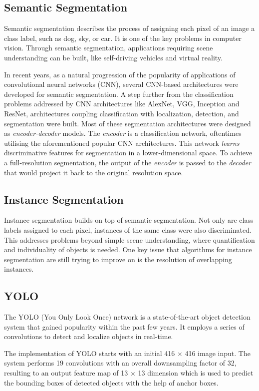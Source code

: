 \documentclass[journal]{IEEEtran}
\begin{document}
\subsection{Semantic Segmentation}
Semantic segmentation describes the process of assigning each pixel of an image a class label, such as dog, sky, or car. It is one of the key problems in computer vision. Through semantic segmentation, applications requiring scene understanding can be built, like self-driving vehicles and virtual reality. 

In recent years, as a natural progression of the popularity of applications of convolutional neural networks (CNN), several CNN-based architectures were developed for semantic segmentation. A step further from the classification problems addressed by CNN architectures like AlexNet, VGG, Inception and ResNet, architectures coupling classification with localization, detection, and segmentation were built. Most of these segmentation architectures were designed as \textit{encoder-decoder} models. The \textit{encoder} is a classification network, oftentimes utilising the aforementioned popular CNN architectures. This network \textit{learns} discriminative features for segmentation in a lower-dimensional space. To achieve a full-resolution segmentation, the output of the \textit{encoder} is passed to the \textit{decoder} that would project it back to the original resolution space.
\subsection{Instance Segmentation}
Instance segmentation builds on top of semantic segmentation. Not only are class labels assigned to each pixel, instances of the same class were also discriminated. This addresses problems beyond simple scene understanding, where quantification and individuality of objects is needed. One key issue that algorithms for instance segmentation are still trying to improve on is the resolution of overlapping instances.
\subsection{YOLO}
The YOLO (You Only Look Once) network \cite{redmon2016yolo9000} is a state-of-the-art object detection system that gained popularity within the past few years. It employs a series of convolutions to detect and localize objects in real-time.

The implementation of YOLO starts with an initial 416 $\times$ 416 image input. The system performs 19 convolutions with an overall downsampling factor of 32, resulting to an output feature map of 13 $\times$ 13 dimension which is used to predict the bounding boxes of detected objects with the help of anchor boxes.
\end{document}
